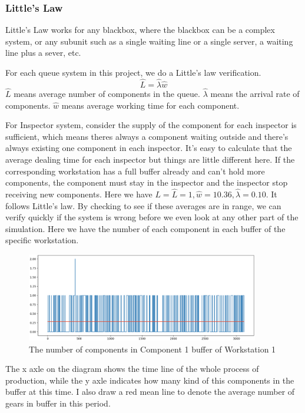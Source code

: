 \documentclass{article}
\begin{document}
\subsubsection{Little's Law}

Little's Law works for any blackbox, where the blackbox can be a complex system, or  any subunit such as a single waiting line or a single server, a waiting line plus a sever, etc. 

For each queue system in this project, we do a Little's law verification.
\begin{equation}
\hat L = \hat \lambda \hat w
\end{equation}
$\hat L$ means average number of components in the queue. $\hat \lambda$ means the arrival rate of components. $\hat w$ means average working time for each component.

For Inspector system, consider the supply of the component for each inspector is sufficient, which means theres always a component waiting outside and there's always existing one component in each inspector. It's easy to calculate that the average dealing time for each inspector but things are little different here. If the corresponding workstation has a full buffer already and can't hold more components, the component must stay in the inspector and the inspector stop receiving new components. Here we have $L=\hat L =1, \hat w = 10.36, \hat \lambda = 0.10$. It follows Little's law. By checking to see if these averages are in range, we can verify quickly if the system is wrong before we even look at any other part of the simulation.
Here we have the number of each component in each buffer of the specific workstation.

\begin{figure}[htbp]
\begin{center}
\includegraphics[width=4in]{W1_C1B.png}
\caption{The number of components in Component 1 buffer of Workstation 1}
\label{W1_C1B}
\end{center}
\end{figure}

The x axle on the diagram shows the time line of the whole process of production, while the y axle indicates how many kind of this components in the buffer at this time. I also draw a red mean line to denote the average number of gears in buffer in this period. 
\end{document}

